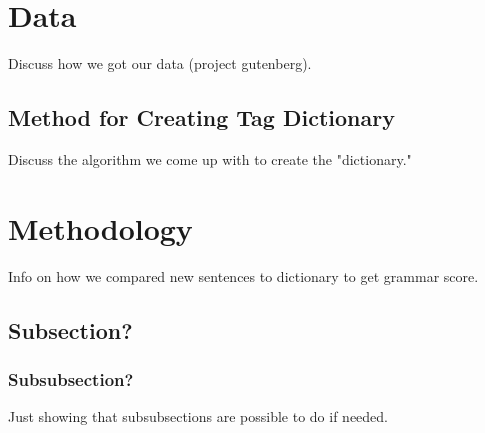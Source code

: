 \documentclass[12pt,a4paper]{article}
\begin{document}
\section{Data}
Discuss how we got our data (project gutenberg).

\subsection{Method for Creating Tag Dictionary}

Discuss the algorithm we come up with to create the "dictionary."

\pagebreak


\section{Methodology}
Info on how we compared new sentences to dictionary to get grammar score.

\subsection{Subsection?}

\subsubsection{Subsubsection?}
Just showing that subsubsections are possible to do if needed.


\end{document}
